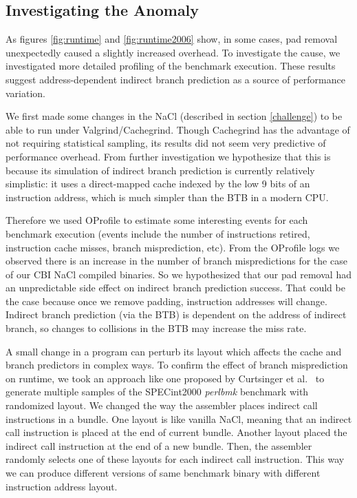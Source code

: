 \documentclass[conference]{IEEEtran}
\begin{document}
\subsection{Investigating the Anomaly}\label{anomaly}
As figures \ref{fig:runtime} and \ref{fig:runtime2006} show, in some cases, pad removal unexpectedly caused a slightly increased overhead. To investigate the cause, we investigated more detailed profiling of the benchmark execution.
%
These results suggest address-dependent indirect branch prediction as
a source of performance variation.



We first made some changes in the NaCl (described in section \ref{challenge}) to be able to run under Valgrind/Cachegrind. 
Though Cachegrind has the advantage of not requiring statistical
sampling, its results did not seem very predictive of performance
overhead.
%
From further investigation we hypothesize that this is because its
simulation of indirect branch prediction is currently relatively
simplistic: it uses a direct-mapped cache indexed by the low 9 bits of
an instruction address, which is much simpler than the BTB in a modern
CPU.

Therefore we used OProfile  to estimate some interesting events for each benchmark execution (events include the number of instructions retired, instruction cache misses, branch misprediction,  etc). From the OProfile logs we observed there is an increase in the number of branch mispredictions for the case of our CBI NaCl compiled binaries. So we hypothesized that our pad removal had an unpredictable side effect on indirect branch prediction success. That could be the case because once we remove padding, instruction addresses will change. Indirect branch prediction (via the BTB) is dependent on the address of indirect branch, so changes to collisions in the BTB  may increase the miss rate.

A small change in a program can perturb its layout which affects the cache and branch predictors in complex ways.
To confirm the effect of branch misprediction on runtime, we took an approach like one proposed by Curtsinger et al.~\cite{curtsingerStabilizer} to generate multiple samples of the SPECint2000 \textit{perlbmk} benchmark with randomized layout.
 We changed the way the assembler places indirect call instructions in a bundle. One layout is like vanilla NaCl, meaning that an indirect call instruction is placed at the end of current bundle. Another layout placed the  indirect call instruction at the end of a new bundle. Then, the assembler randomly selects one of these layouts for each indirect call instruction. This way we can produce different versions of same benchmark binary with different instruction address layout. 
\end{document}
